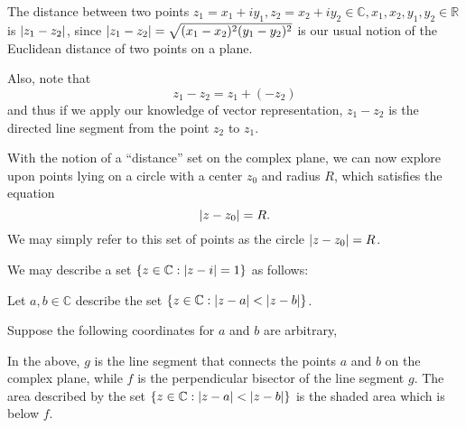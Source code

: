 \documentclass[11pt, oneside]{book}
\begin{document}
The distance between two points $z_1 = x_1 + iy_1, z_2 = x_2 + iy_2 \in \mathbb{C}, x_1, x_2, y_1, y_2 \in \mathbb{R}$ is $\left|z_1 - z_2\right|$, since $\left|z_1 - z_2\right| = \sqrt{(x_1 - x_2)^2 (y_1 - y_2)^2}$ is our usual notion of the Euclidean distance of two points on a plane.

Also, note that
\begin{equation*}
	z_1 - z_2 = z_1 + (-z_2)
\end{equation*}
and thus if we apply our knowledge of vector representation, $z_1 - z_2$ is the directed line segment from the point $z_2$ to $z_1$.

With the notion of a ``distance'' set on the complex plane, we can now explore upon points lying on a circle with a center $z_0$ and radius $R$, which satisfies the equation
\begin{equation*}
	\left|z - z_0\right| = R.
\end{equation*}
We may simply refer to this set of points as the circle $\left|z - z_0\right| = R$.

\begin{eg}
	We may describe a set $\left\{z \in \mathbb{C} : \left|z -i\right| = 1 \right\}$ as follows:

	\begin{center}
	\end{center}

	Let $a, b \in \mathbb{C}$ describe the set $\left\{z \in \mathbb{C} : \left|z - a\right| < \left|z - b\right| \right\}$.

	Suppose the following coordinates for $a$ and $b$ are arbitrary,

	\begin{center}
	\end{center}

	In the above, $g$ is the line segment that connects the points $a$ and $b$ on the complex plane, while $f$ is the perpendicular bisector of the line segment $g$. The area described by the set $\left\{z \in \mathbb{C} : \left|z - a\right| < \left|z - b\right| \right\}$ is the shaded area which is below $f$.
\end{eg}
\end{document}
